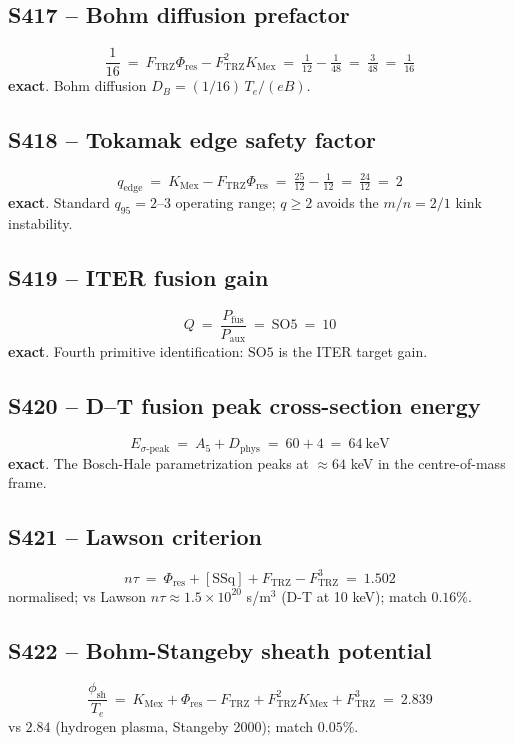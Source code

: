 \documentclass[11pt]{article}
\newcommand{\Ftrz}{F_{\mathrm{TRZ}}}
\newcommand{\Phires}{\Phi_{\mathrm{res}}}
\newcommand{\KMex}{K_{\mathrm{Mex}}}
\newcommand{\Dphys}{D_{\mathrm{phys}}}
\newcommand{\SOfive}{\mathrm{SO5}}
\newcommand{\Afive}{A_{5}}
\newcommand{\SSq}{[\mathrm{SSq}]}
\begin{document}
\subsection{S417 -- Bohm diffusion prefactor}
\[
\frac{1}{16}\ =\ \Ftrz\Phires-\Ftrz^{2}\KMex\ =\ \tfrac{1}{12}-\tfrac{1}{48}\ =\ \tfrac{3}{48}\ =\ \tfrac{1}{16}
\]
\textbf{exact}.  Bohm diffusion $D_{B}=(1/16)\,T_{e}/(eB)$.

\subsection{S418 -- Tokamak edge safety factor}
\[
q_{\mathrm{edge}}\ =\ \KMex-\Ftrz\Phires\ =\ \tfrac{25}{12}-\tfrac{1}{12}\ =\ \tfrac{24}{12}\ =\ 2
\]
\textbf{exact}. Standard $q_{95}=2$--$3$ operating range; $q\geq 2$ avoids the $m/n=2/1$ kink instability.

\subsection{S419 -- ITER fusion gain}
\[
Q\ =\ \frac{P_{\text{fus}}}{P_{\text{aux}}}\ =\ \SOfive\ =\ 10
\]
\textbf{exact}. Fourth primitive identification: $\SOfive$ is the ITER
target gain.

\subsection{S420 -- D--T fusion peak cross-section energy}
\[
E_{\sigma\text{-peak}}\ =\ \Afive+\Dphys\ =\ 60+4\ =\ 64\ \text{keV}
\]
\textbf{exact}. The Bosch-Hale parametrization peaks at $\approx 64$ keV in the centre-of-mass frame.

\subsection{S421 -- Lawson criterion}
\[
n\tau\ =\ \Phires+\SSq+\Ftrz-\Ftrz^{3}\ =\ 1.502
\]
normalised; vs Lawson $n\tau\approx 1.5\times 10^{20}$ s/m$^{3}$ (D-T at 10 keV); match $0.16\%$.

\subsection{S422 -- Bohm-Stangeby sheath potential}
\[
\frac{\phi_{\mathrm{sh}}}{T_{e}}\ =\ \KMex+\Phires-\Ftrz+\Ftrz^{2}\KMex+\Ftrz^{3}\ =\ 2.839
\]
vs $2.84$ (hydrogen plasma, Stangeby 2000); match $0.05\%$.
\end{document}
